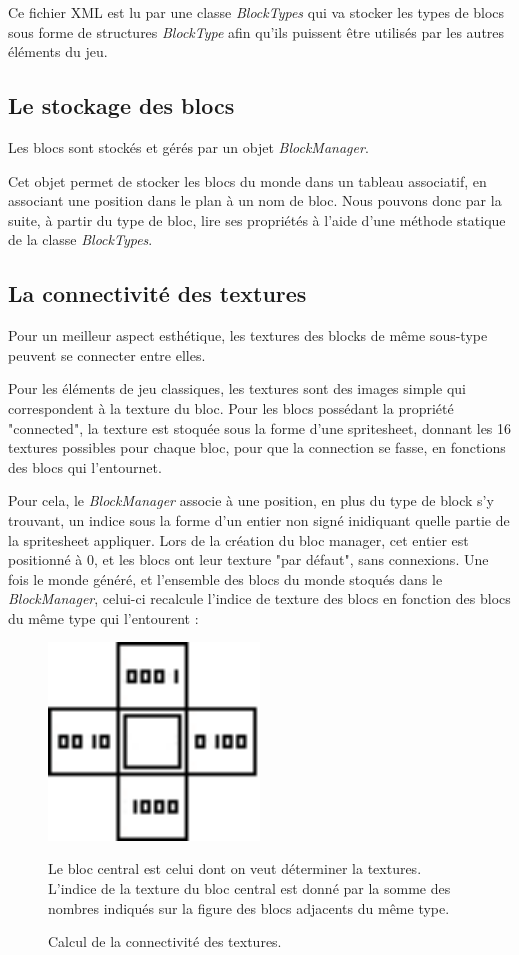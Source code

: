 \documentclass[10pt]{report}
\begin{document}
Ce fichier XML est lu par une classe \emph{BlockTypes} qui va stocker les types de blocs sous forme de structures \emph{BlockType} afin qu'ils puissent être utilisés par les autres éléments du jeu.
  
\subsection{Le stockage des blocs}

Les blocs sont stockés et gérés par un objet \emph{BlockManager}.

Cet objet permet de stocker les blocs du monde dans un tableau associatif, en associant une position dans le plan à un nom de bloc.
Nous pouvons donc par la suite, à partir du type de bloc, lire ses propriétés à l'aide d'une méthode statique de la classe \emph{BlockTypes}.

\subsection{La connectivité des textures}

Pour un meilleur aspect esthétique, les textures des blocks de même sous-type peuvent se connecter entre elles.

Pour les éléments de jeu classiques, les textures sont des images simple qui correspondent à la texture du bloc. Pour les blocs possédant la propriété "connected", la texture est stoquée sous la forme d'une spritesheet, donnant les 16 textures possibles pour chaque bloc, pour que la connection se fasse, en fonctions des blocs qui l'entournet.

Pour cela, le \emph{BlockManager} associe à une position, en plus du type de block s'y trouvant, un indice sous la forme d'un entier non signé inidiquant quelle partie de la spritesheet appliquer.
Lors de la création du bloc manager, cet entier est positionné à 0, et les blocs ont leur texture "par défaut", sans connexions.
Une fois le monde généré, et l'ensemble des blocs du monde stoqués dans le \emph{BlockManager}, celui-ci recalcule l'indice de texture des blocs en fonction des blocs du même type qui l'entourent :

\begin{figure}[H]
  \centering
  \includegraphics[width=0.5\textwidth]{images/connected_textures_offset_computing}
  \caption{Calcul de la connectivité des textures.}
  Le bloc central est celui dont on veut déterminer la textures.
  L'indice de la texture du bloc central est donné par la somme des nombres indiqués sur la figure des blocs adjacents du même type.
  \label{fig:connected_textures_computing}
\end{figure}
\end{document}
